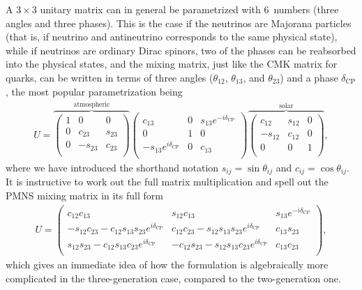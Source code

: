 A $3 \times 3$ unitary matrix can in general be parametrized with 6~numbers (three
angles and three phases). This is the case if the neutrinos are Majorana
particles (that is, if neutrino and antineutrino corresponds to the same
physical state), while if neutrinos are ordinary Dirac spinors, two of the phases
can be reabsorbed into the physical states, and the mixing matrix, just like the
CMK matrix for quarks, can be written in terms of three angles ($\theta_{12}$,
$\theta_{13}$, and $\theta_{23}$) and a phase $\delta_\text{CP}$, the most popular
parametrization being
\begin{align}
  U =
  \overbrace{
  \begin{pmatrix}
    1 & 0 & 0\\
    0 & c_{23} & s_{23}\\
    0 & -s_{23} & c_23 \\
  \end{pmatrix}
  }^\text{atmospheric}
  \begin{pmatrix}
    c_{13} & 0 & s_{13} e^{-i\delta_\text{CP}}\\
    0 & 1 & 0\\
    -s_{13} e^{i\delta_\text{CP}} & 0 & c_13\\
  \end{pmatrix}
  \overbrace{
  \begin{pmatrix}
    c_{12} & s_{12} & 0\\
    -s_{12} & c_12 & 0\\
    0 & 0 & 1\\
  \end{pmatrix}
  }^\text{solar},
\end{align}
where we have introduced the shorthand notation $s_{ij} = \sin\theta_{ij}$ and
$c_{ij} = \cos\theta_{ij}$. It is instructive to work out the full matrix multiplication
and spell out the PMNS mixing matrix in its full form
\begin{align}
  U =
  \begin{pmatrix}
    c_{12}c_{13} & s_{12}c_{13} & s_{13} e^{-i\delta_\text{CP}}\\
    -s_{12}c_{23} -c_{12}s_{13}s_{23}e^{i\delta_\text{CP}} &
      c_{12}c_{23} - s_{12}s_{13}s_{23}e^{i\delta_\text{CP}} & c_{13}s_{23}\\
    s_{12}s_{23} - c_{12}s_{13}c_{23}e^{i\delta_\text{CP}} &
      -c_{12}s_{23} - s_{12}s_{13}c_{23}e^{i\delta_\text{CP}} & c_{13}c_{23}\\
  \end{pmatrix},
\end{align}
which gives an immediate idea of how the formulation is algebraically more complicated
in the three-generation case, compared to the two-generation one.



